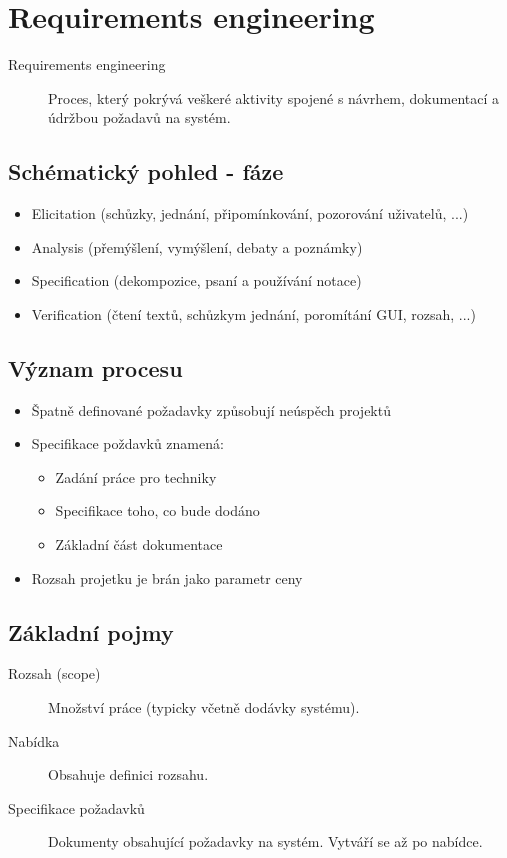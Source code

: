 \section{Requirements engineering}
  \begin{description}
    \item[Requirements engineering] Proces, který pokrývá veškeré aktivity spojené s návrhem,
    dokumentací a údržbou požadavů na systém.
  \end{description}

  \subsection{Schématický pohled - fáze}
    \begin{itemize}
      \item Elicitation (schůzky, jednání, připomínkování, pozorování uživatelů, ...)
      \item Analysis (přemýšlení, vymýšlení, debaty a poznámky)
      \item Specification (dekompozice, psaní a používání notace)
      \item Verification (čtení textů, schůzkym jednání, poromítání GUI, rozsah, ...)
    \end{itemize}

  \subsection{Význam procesu}
    \begin{itemize}
      \item Špatně definované požadavky způsobují neúspěch projektů
      \item Specifikace poždavků znamená:
        \begin{itemize}
          \item Zadání práce pro techniky
          \item Specifikace toho, co bude dodáno
          \item Základní část dokumentace
        \end{itemize}
      \item Rozsah projetku je brán jako parametr ceny
    \end{itemize}

  \subsection{Základní pojmy}
    \begin{description}
      \item[Rozsah (scope)] Množství práce (typicky včetně dodávky systému).
      \item[Nabídka] Obsahuje definici rozsahu.
      \item[Specifikace požadavků] Dokumenty obsahující požadavky na systém. Vytváří se až po nabídce.
    \end{description}

